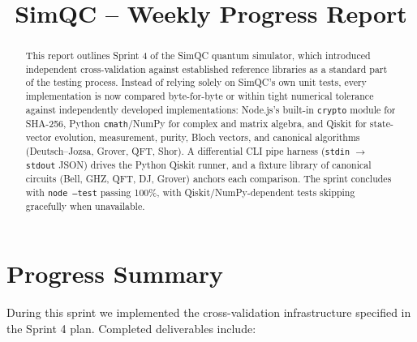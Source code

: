 \documentclass[conference]{IEEEtran}
\begin{document}
\title{SimQC -- Weekly Progress Report\\}
\author{
}

\maketitle

\begin{abstract}
This report outlines Sprint 4 of the SimQC quantum simulator, which introduced independent cross-validation against established reference libraries as a standard part of the testing process. Instead of relying solely on SimQC's own unit tests, every implementation is now compared byte-for-byte or within tight numerical tolerance against independently developed implementations: Node.js's built-in \texttt{crypto} module for SHA-256, Python \texttt{cmath}/NumPy for complex and matrix algebra, and Qiskit for state-vector evolution, measurement, purity, Bloch vectors, and canonical algorithms (Deutsch--Jozsa, Grover, QFT, Shor). A differential CLI pipe harness (\texttt{stdin} $\to$ \texttt{stdout} JSON) drives the Python Qiskit runner, and a fixture library of canonical circuits (Bell, GHZ, QFT, DJ, Grover) anchors each comparison. The sprint concludes with \texttt{node --test} passing 100\%, with Qiskit/NumPy-dependent tests skipping gracefully when unavailable.
\end{abstract}

\section{Progress Summary}
During this sprint we implemented the cross-validation infrastructure specified in the Sprint 4 plan. Completed deliverables include:
\end{document}
